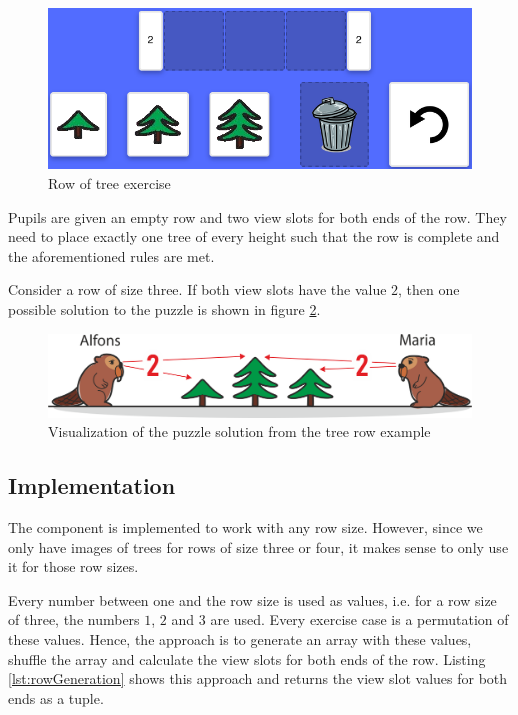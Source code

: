 \begin{figure} 
    \centering
    \includegraphics[width=0.8 \columnwidth]{figures/tree_row_example_exercise.png}
    \caption{Row of tree exercise} 
    \label{fig:tree_row_example_exercise} 
\end{figure}

Pupils are given an empty row and two view slots for both ends of the row. They need to place exactly one tree of every height such that the row is complete and the aforementioned rules are met.

\begin{example}
    Consider a row of size three. If both view slots have the value $2$, then one possible solution to the puzzle is shown in figure \ref{fig:tree_row_visible_tree}.
\end{example}

\begin{figure} 
    \centering
    \includegraphics[width=0.8 \columnwidth]{figures/tree_row_example.png}
    \caption{Visualization of the puzzle solution from the tree row example} 
    \label{fig:tree_row_visible_tree} 
\end{figure}

\subsection{Implementation}

The  component is implemented to work with any row size. However, since we only have images of trees for rows of size three or four, it makes sense to only use it for those row sizes.

Every number between one and the row size is used as values, i.e. for a row size of three, the numbers $1$, $2$ and $3$ are used. Every exercise case is a permutation of these values. Hence, the approach is to generate an array with these values, shuffle the array and calculate the view slots for both ends of the row. Listing \ref{lst:rowGeneration} shows this approach and returns the view slot values for both ends as a tuple.


